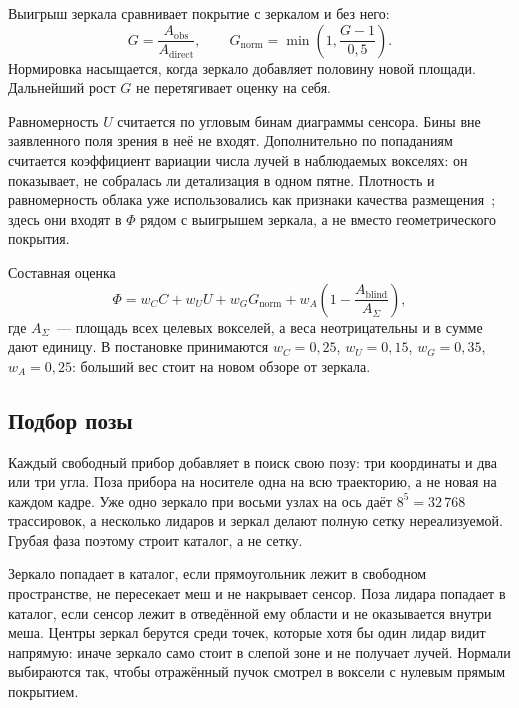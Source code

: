 \documentclass{misisarticle}
\begin{document}
Выигрыш зеркала сравнивает покрытие с зеркалом и без него:
\begin{equation}
  G = \frac{A_{\mathrm{obs}}}{A_{\mathrm{direct}}}, \qquad
  G_{\mathrm{norm}} = \min\left(1,\frac{G - 1}{0{,}5}\right).
  \label{eq:gain}
\end{equation}
Нормировка насыщается, когда зеркало добавляет половину новой площади. Дальнейший рост \(G\) не перетягивает оценку на себя.

Равномерность \(U\) считается по угловым бинам диаграммы сенсора. Бины вне заявленного поля зрения в неё не входят. Дополнительно по попаданиям считается коэффициент вариации числа лучей в наблюдаемых вокселях: он показывает, не собралась ли детализация в одном пятне. Плотность и равномерность облака уже использовались как признаки качества размещения~\cite{cai2023}; здесь они входят в \(\Phi\) рядом с выигрышем зеркала, а не вместо геометрического покрытия.

Составная оценка
\begin{equation}
  \Phi = w_{C} C + w_{U} U + w_{G} G_{\mathrm{norm}}
        + w_{A}\left(1 - \frac{A_{\mathrm{blind}}}{A_{\Sigma}}\right),
  \label{eq:phi}
\end{equation}
где \(A_{\Sigma}\)~--- площадь всех целевых вокселей, а веса неотрицательны и в сумме дают единицу. В постановке принимаются \(w_{C} = 0{,}25\), \(w_{U} = 0{,}15\), \(w_{G} = 0{,}35\), \(w_{A} = 0{,}25\): больший вес стоит на новом обзоре от зеркала.

\subsection{Подбор позы}

Каждый свободный прибор добавляет в поиск свою позу: три координаты и два или три угла. Поза прибора на носителе одна на всю траекторию, а не новая на каждом кадре. Уже одно зеркало при восьми узлах на ось даёт \(8^{5} = 32\,768\) трассировок, а несколько лидаров и зеркал делают полную сетку нереализуемой. Грубая фаза поэтому строит каталог, а не сетку.

Зеркало попадает в каталог, если прямоугольник лежит в свободном пространстве, не пересекает меш и не накрывает сенсор. Поза лидара попадает в каталог, если сенсор лежит в отведённой ему области и не оказывается внутри меша. Центры зеркал берутся среди точек, которые хотя бы один лидар видит напрямую: иначе зеркало само стоит в слепой зоне и не получает лучей. Нормали выбираются так, чтобы отражённый пучок смотрел в воксели с нулевым прямым покрытием.
\end{document}

